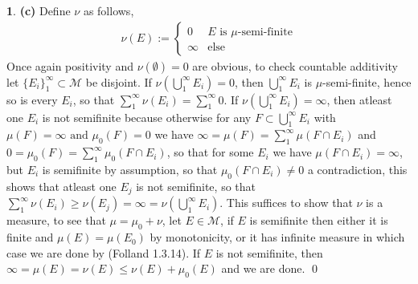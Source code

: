 \documentclass[10.5pt]{article}
\theoremstyle{definition}
\newtheorem{pb}{}
\newcommand{\set}[1]{\{#1\}}
\newcommand{\tand}{\text{ and }}
\begin{document}
\begin{pb}
        \textbf{(c)} Define \(\nu\) as follows,
        \begin{align*}
            \nu(E) := \begin{cases}
                0 & E \text{ is \(\mu\)-semi-finite}\\
                \infty & \text{else}
            \end{cases}
        \end{align*}
        Once again positivity and \(\nu(\emptyset) = 0\) are obvious, to check countable additivity let \(\set{E_i}_1^\infty \subset \mathcal{M}\) be disjoint. If \(\nu(\bigcup_1^\infty E_i) = 0\), then \(\bigcup_1^\infty E_i\) is \(\mu\)-semi-finite, hence so is every \(E_i\), so that \(\sum_1^\infty \nu(E_i) = \sum_1^\infty 0\). If \(\nu(\bigcup_1^\infty E_i) = \infty\), then atleast one \(E_i\) is not semifinite because otherwise for any \(F \subset \bigcup_1^\infty E_i\) with \(\mu(F) = \infty \tand \mu_0(F) = 0\) we have \(\infty = \mu(F) = \sum_1^\infty \mu(F \cap E_i)\) and \(0 = \mu_0(F) = \sum_1^\infty \mu_0(F \cap E_i)\), so that for some \(E_i\) we have \(\mu(F \cap E_i) = \infty\), but \(E_i\) is semifinite by assumption, so that \(\mu_0(F\cap E_i) \neq 0\) a contradiction, this shows that atleast one \(E_j\) is not semifinite, so that \(\sum_1^\infty \nu(E_i) \geq \nu(E_j) = \infty = \nu(\bigcup_1^\infty E_i)\). This suffices to show that \(\nu\) is a measure, to see that \(\mu = \mu_0 + \nu\), let \(E \in \mathcal{M}\), if \(E\) is semifinite then either it is finite and \(\mu(E) = \mu(E_0)\) by monotonicity, or it has infinite measure in which case we are done by (Folland 1.3.14). If \(E\) is not semifinite, then \(\infty = \mu(E) = \nu(E) \leq \nu(E) + \mu_0(E)\) and we are done. \qed
    \end{pb}
\end{document}

